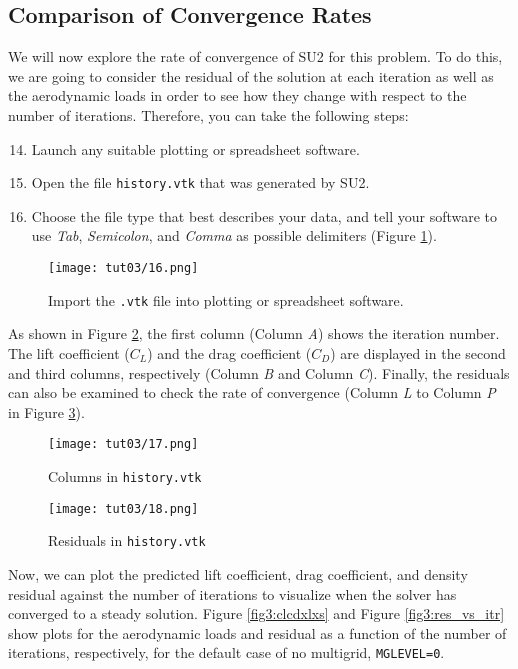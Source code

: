 \subsection{Comparison of Convergence Rates}
We will now explore the rate of convergence of SU2 for this problem. To do this, we are going to consider the residual of the solution at each iteration as well as the aerodynamic loads in order to see how they change with respect to the number of iterations. Therefore, you can take the following steps:
\begin{enumerate}[label=\arabic*)]
	\setcounter{enumi}{13}
	\item Launch any suitable plotting or spreadsheet software.
	\item Open the file \texttt{history.vtk} that was generated by SU2.
	\item Choose the file type that best describes your data, and tell your software to use \textit{Tab}, \textit{Semicolon}, and \textit{Comma} as possible delimiters (Figure \ref{fig3:importvtkxlxs}).
\end{enumerate} 
\begin{figure}[ht]
    \centering
    \texttt{[image: tut03/16.png]}
    \caption{Import the \texttt{.vtk} file into plotting or spreadsheet software.}
    \label{fig3:importvtkxlxs}
\end{figure}
As shown in Figure \ref{fig3:columnsxlxs}, the first column (Column \textit{A}) shows the iteration number. The lift coefficient ($C_L$) and the drag coefficient ($C_D$) are displayed in the second and third columns, respectively (Column \textit{B} and Column \textit{C}). Finally, the residuals can also be examined to check the rate of convergence (Column \textit{L} to Column \textit{P} in Figure \ref{fig3:residualxlxs}).
\begin{figure}[ht]
    \centering
    \texttt{[image: tut03/17.png]}
    \caption{Columns in \texttt{history.vtk}}
    \label{fig3:columnsxlxs}
\end{figure}
\begin{figure}[H]
    \centering
    \texttt{[image: tut03/18.png]}
    \caption{Residuals in \texttt{history.vtk}}
    \label{fig3:residualxlxs}
\end{figure}
Now, we can plot the predicted lift coefficient, drag coefficient, and density residual against the number of iterations to visualize when the solver has converged to a steady solution. Figure \ref{fig3:clcdxlxs} and Figure \ref{fig3:res_vs_itr} show plots for the aerodynamic loads and residual as a function of the number of iterations, respectively, for the default case of no multigrid, \texttt{MGLEVEL=0}.
